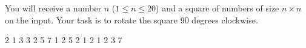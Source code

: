 




You will receive a number $n$ ($1\leq n \leq 20$) and a square of numbers of size $n\times n$ on the input. Your task is to rotate the square 90 degrees clockwise.

2 1 3 
3 2 5 
7 1 2 
 5 2
1 2 1
2 3 7
\koniec


